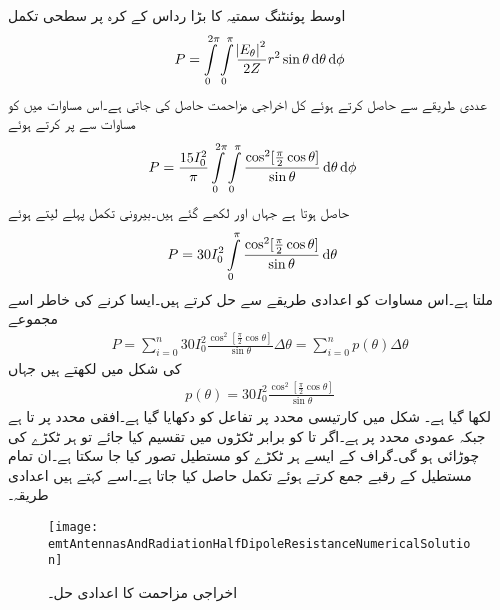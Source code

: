 اوسط پوئنٹنگ سمتیہ کا بڑا رداس کے کرہ پر سطحی تکمل
\begin{align}
P=\int \limits_{0}^{2\pi}\int \limits_{0}^{\pi}  \frac{\abs{E_{\theta}}^2}{2 Z} r^2 \sin \theta \dif \theta \dif \phi
\end{align}
عددی طریقے سے حاصل کرتے ہوئے کل اخراجی مزاحمت   حاصل کی جاتی ہے۔اس مساوات میں  کو مساوات  سے پر کرتے ہوئے 
\begin{align*}
P&= \frac{15 I_0^2}{\pi}\int \limits_{0}^{2\pi}\int \limits_{0}^{\pi}  \frac{\cos^2 [\frac{\pi}{2} \cos \theta]}{\sin \theta} \dif \theta \dif \phi
\end{align*}
حاصل ہوتا ہے جہاں  اور  لکھے گئے ہیں۔بیرونی تکمل پہلے لیتے ہوئے
\begin{align}\label{مساوات_اینٹینا_نصف_طول_موج_اخراجی_طاقت_الف}
P&= 30 I_0^2\int \limits_{0}^{\pi}  \frac{\cos^2 [\frac{\pi}{2} \cos \theta]}{\sin \theta} \dif \theta
\end{align}
ملتا ہے۔اس مساوات کو اعدادی طریقے سے حل کرتے ہیں۔ایسا کرنے کی خاطر اسے مجموعے
\begin{align}
P=\sum_{i=0}^{n} 30 I_0^2  \frac{\cos^2 [\frac{\pi}{2} \cos \theta]}{\sin \theta} \Delta  \theta =\sum_{i=0}^{n} p(\theta) \Delta \theta
\end{align}
کی شکل میں لکھتے ہیں جہاں
\begin{align}\label{مساوات_اینٹینا_اخراجی_مزاحمت_عددی_الف}
p(\theta)=30 I_0^2  \frac{\cos^2 [\frac{\pi}{2} \cos \theta]}{\sin \theta}
\end{align}
لکھا گیا ہے۔ شکل  میں کارتیسی محدد پر  تفاعل   کو دکھایا گیا ہے۔افقی محدد پر  تا  ہے  جبکہ عمودی محدد پر  ہے۔اگر  تا  کو  برابر ٹکڑوں میں تقسیم کیا جائے تو ہر ٹکڑے کی چوڑائی  ہو گی۔گراف کے ایسے ہر ٹکڑے کو مستطیل تصور کیا جا سکتا ہے۔ان تمام مستطیل کے رقبے جمع کرتے ہوئے تکمل حاصل کیا جاتا ہے۔اسے کہتے ہیں اعدادی طریقہ۔
\begin{figure}
\centering
\texttt{[image: emtAntennasAndRadiationHalfDipoleResistanceNumericalSolution]}
\caption{اخراجی مزاحمت کا اعدادی حل۔}
\label{شکل_اینٹینا_اخراجی_مزاحمت_عددی_حل}
\end{figure}

